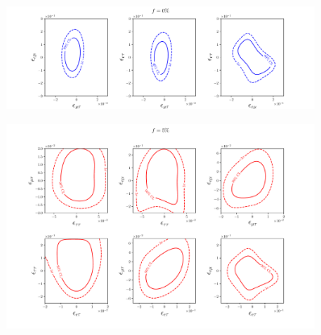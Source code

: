 \documentclass[draft=True]{revtex4-2}
\begin{document}
{{%

\begin{figure}
   \includegraphics[width=0.9\textwidth]{figures/PINGU_2D_all_f0.pdf}
\end{figure}
\begin{figure}
   \includegraphics[width=0.9\textwidth]{figures/PINGU_2D_all_f5.pdf}
\end{figure}



}}
\end{document}

